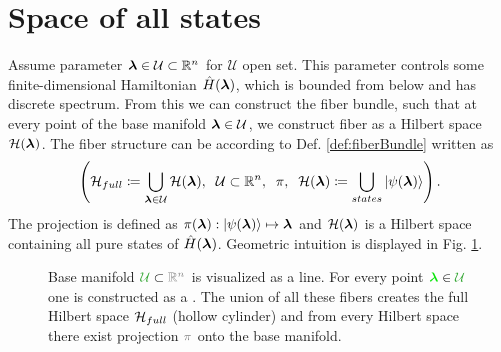 \section{Space of all states}
Assume parameter ${\bm\lambda}\in\mathcal{U}\subset\mathbb{R}^n$ for $\mathcal U$ open set. This parameter controls some finite-dimensional Hamiltonian $\hat{H}({\bm\lambda})$, which is bounded from below and has discrete spectrum. From this we can construct the fiber bundle, such that at every point of the base manifold ${\bm\lambda}\in \mathcal{U}$, we construct fiber as a Hilbert space $\mathcal{H}({\bm\lambda})$. The fiber structure can be according to Def. \ref{def:fiberBundle} written as
$$\left(\mathcal{H}_{full}\coloneqq \bigcup_{{\bm\lambda}\in\mathcal U} \mathcal{H}({\bm\lambda}),\;\;\mathcal{U}\subset \mathbb{R}^n,\;\;\pi,\;\; \mathcal{H}({\bm\lambda}) \coloneqq \bigcup_{states}\ket{\psi({\bm\lambda})}  \right).$$
The projection is defined as $\pi({\bm\lambda}): \ket{\psi({\bm\lambda})}\mapsto {\bm\lambda}$ and $\mathcal{H}({\bm\lambda})$ is a Hilbert space containing all pure states of $\hat{H}({\bm\lambda})$. Geometric intuition is displayed in Fig. \ref{fig:wholeBundle}.

\begin{figure}[h]
    \centering

\caption{Base manifold $\greenn{\mathcal U}\subset \gray{\R^n}$ is visualized as a line. For every point $\green\llambda\in\greenn{\mathcal U}$ one  is constructed as a . The union of all these fibers creates the full Hilbert space $\mathcal{H}_{full}$ (hollow cylinder) and from every Hilbert space there exist projection $\gray{\pi}$ onto the base manifold.}
    \label{fig:wholeBundle}
\end{figure}




